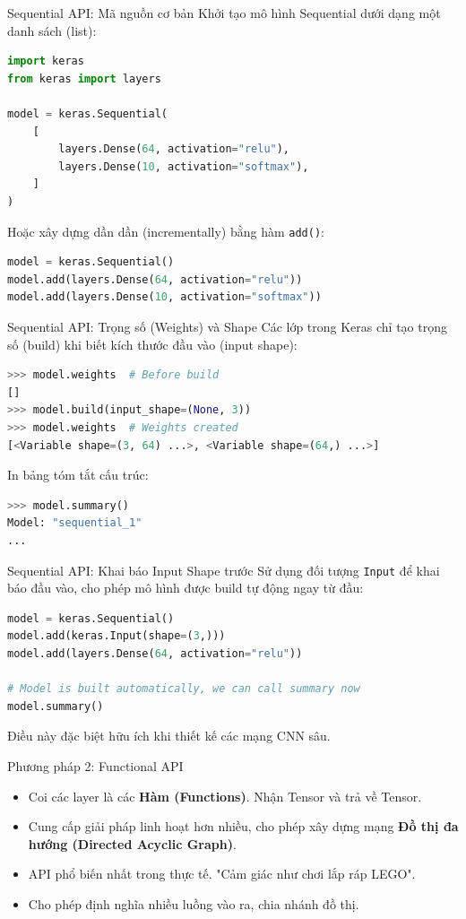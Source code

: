 \documentclass[aspectratio=169]{beamer}
\begin{document}
\begin{frame}[fragile]{Sequential API: Mã nguồn cơ bản}
Khởi tạo mô hình Sequential dưới dạng một danh sách (list):
\begin{lstlisting}[language=Python]
import keras
from keras import layers

model = keras.Sequential(
    [
        layers.Dense(64, activation="relu"),
        layers.Dense(10, activation="softmax"),
    ]
)
\end{lstlisting}
Hoặc xây dựng dần dần (incrementally) bằng hàm \texttt{add()}:
\begin{lstlisting}[language=Python]
model = keras.Sequential()
model.add(layers.Dense(64, activation="relu"))
model.add(layers.Dense(10, activation="softmax"))
\end{lstlisting}
\end{frame}

\begin{frame}[fragile]{Sequential API: Trọng số (Weights) và Shape}
Các lớp trong Keras chỉ tạo trọng số (build) khi biết kích thước đầu vào (input shape):
\begin{lstlisting}[language=Python]
>>> model.weights  # Before build
[]
>>> model.build(input_shape=(None, 3))
>>> model.weights  # Weights created
[<Variable shape=(3, 64) ...>, <Variable shape=(64,) ...>]
\end{lstlisting}
In bảng tóm tắt cấu trúc:
\begin{lstlisting}[language=Python]
>>> model.summary()
Model: "sequential_1"
...
\end{lstlisting}
\end{frame}

\begin{frame}[fragile]{Sequential API: Khai báo Input Shape trước}
Sử dụng đối tượng \texttt{Input} để khai báo đầu vào, cho phép mô hình được build tự động ngay từ đầu:
\begin{lstlisting}[language=Python]
model = keras.Sequential()
model.add(keras.Input(shape=(3,)))
model.add(layers.Dense(64, activation="relu"))

# Model is built automatically, we can call summary now
model.summary()
\end{lstlisting}
Điều này đặc biệt hữu ích khi thiết kế các mạng CNN sâu.
\end{frame}

\begin{frame}{Phương pháp 2: Functional API}
    \begin{itemize}
        \item Coi các layer là các \textbf{Hàm (Functions)}. Nhận Tensor và trả về Tensor.
        \item Cung cấp giải pháp linh hoạt hơn nhiều, cho phép xây dựng mạng \textbf{Đồ thị đa hướng (Directed Acyclic Graph)}.
        \item API phổ biến nhất trong thực tế. "Cảm giác như chơi lắp ráp LEGO".
        \item Cho phép định nghĩa nhiều luồng vào ra, chia nhánh đồ thị.
    \end{itemize}
\end{frame}
\end{document}
